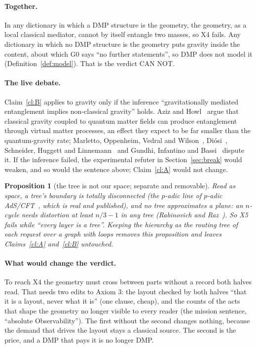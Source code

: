 \documentclass[11pt,a4paper]{article}
\newtheorem{proposition}{Proposition}
\theoremstyle{definition}
\theoremstyle{remark}
\begin{document}
\paragraph{Together.} In any dictionary in which a DMP structure is the geometry, the geometry, as a local classical mediator, cannot by
itself entangle two masses, so X4 fails. Any dictionary in which no DMP structure is the geometry puts gravity inside the content, about which G0 says ``no further
statements'', so DMP does not model it (Definition~\ref{def:model}). That is the verdict CAN NOT.

\paragraph{The live debate.} Claim~\ref{cl:B} applies to gravity only if the inference ``gravitationally mediated entanglement implies
non-classical gravity'' holds. Aziz and Howl~\cite{azizhowl} argue that classical gravity coupled to quantum matter fields can produce
entanglement through virtual matter processes, an effect they expect to be far smaller than the quantum-gravity rate; Marletto, Oppenheim,
Vedral and Wilson~\cite{movw}, Di\'osi~\cite{diosi}, Schneider, Huggett and Linnemann~\cite{shl} and Gundhi, Infantino and
Bassi~\cite{gib} dispute it. If the inference failed, the experimental refuter in Section~\ref{sec:break} would weaken, and so would the
sentence above; Claim~\ref{cl:A} would not change.

\begin{proposition}[the tree is not our space; separate and removable]\label{pr:C}
Read as space, a tree's boundary is totally disconnected (the $p$-adic line of $p$-adic AdS/CFT~\cite{hmss,gubser}, which is real and
published), and no tree approximates a plane: an $n$-cycle needs distortion at least $n/3-1$ in any tree (Rabinovich and Raz~\cite{rr}).
So X5 fails while ``every layer is a tree''. Keeping the hierarchy as the routing tree of each request over a graph with loops removes this
proposition and leaves Claims~\ref{cl:A} and~\ref{cl:B} untouched.
\end{proposition}

\paragraph{What would change the verdict.} To reach X4 the geometry must cross between parts without a record both halves read. That needs
two edits to Axiom 3: the layout checked by both halves ``that it is a layout, never what it is'' (one clause, cheap), and the counts of
the acts that shape the geometry no longer visible to every reader (the mission sentence, ``absolute Observability''). The first without
the second changes nothing, because the demand that drives the layout stays a classical source. The second is the price, and a DMP that
pays it is no longer DMP.
\end{document}
